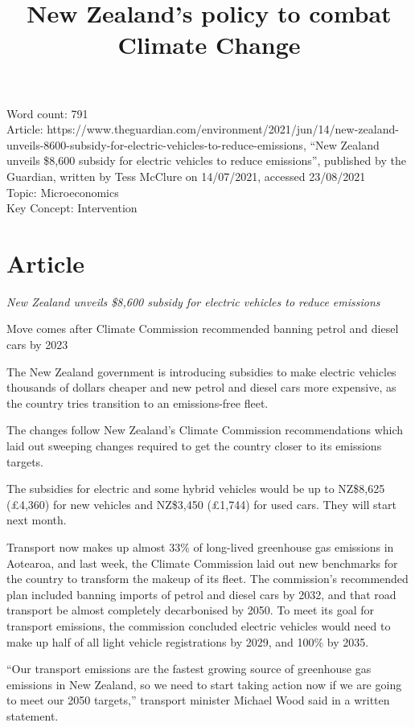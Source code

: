 \documentclass[a4paper,12pt]{article}
\title{New Zealand's policy to combat Climate Change}
\author{\vspace{-8ex}}
\date{\vspace{-8ex}}
\newenvironment{itenv}
{\itshape}
    {}
\begin{document}
\maketitle

Word count: 791\\
Article: https://www.theguardian.com/environment/2021/jun/14/new-zealand-unveils-8600-subsidy-for-electric-vehicles-to-reduce-emissions, ``New Zealand unveils \$8,600 subsidy for electric vehicles to reduce emissions'', published by the Guardian, written by Tess McClure on 14/07/2021, accessed 23/08/2021\\
Topic: Microeconomics\\
Key Concept: Intervention

\newpage
\section*{Article}
\begin{itenv}
New Zealand unveils \$8,600 subsidy for electric vehicles to reduce emissions

Move comes after Climate Commission recommended banning petrol and diesel cars by 2023
\end{itenv}


The New Zealand government is introducing subsidies to make electric vehicles thousands of dollars cheaper and new petrol and diesel cars more expensive, as the country tries transition to an emissions-free fleet.

The changes follow New Zealand’s Climate Commission recommendations which laid out sweeping changes required to get the country closer to its emissions targets.

The subsidies for electric and some hybrid vehicles would be up to NZ\$8,625 (£4,360) for new vehicles and NZ\$3,450 (£1,744) for used cars. They will start next month.

Transport now makes up almost 33\% of long-lived greenhouse gas emissions in Aotearoa, and last week, the Climate Commission laid out new benchmarks for the country to transform the makeup of its fleet. The commission’s recommended plan included banning imports of petrol and diesel cars by 2032, and that road transport be almost completely decarbonised by 2050. To meet its goal for transport emissions, the commission concluded electric vehicles would need to make up half of all light vehicle registrations by 2029, and 100\% by 2035.

“Our transport emissions are the fastest growing source of greenhouse gas emissions in New Zealand, so we need to start taking action now if we are going to meet our 2050 targets,” transport minister Michael Wood said in a written statement.
\end{document}
